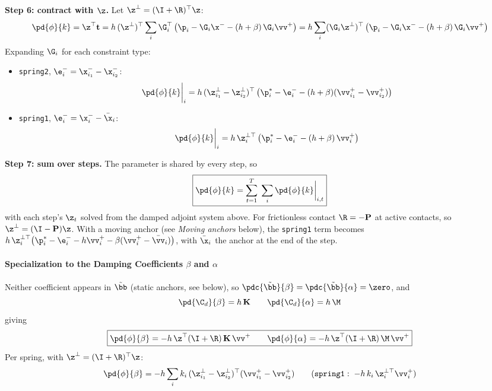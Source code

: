 \begin{derivation}
\textbf{Step 6: contract with $\z$.} Let $\z^\perp = (\I+\R)^\top\z$:
\begin{equation*}
    \pd{\phi}{k} = \z^\top\mathbf{t}
    = h\,(\z^\perp)^\top\sum_i\G_i^\top\left(\p_i - \G_i\x^- - (h+\beta)\,\G_i\vv^+\right)
    = h\sum_i(\G_i\z^\perp)^\top\left(\p_i - \G_i\x^- - (h+\beta)\,\G_i\vv^+\right)
\end{equation*}
Expanding $\G_i$ for each constraint type:
\begin{itemize}
    \item \texttt{spring2}, $\e_i^- = \x^-_{i_1} - \x^-_{i_2}$:
    \begin{equation}
        \pd{\phi}{k}\bigg|_i = h\,(\z^\perp_{i_1} - \z^\perp_{i_2})^\top\left(\p_i^* - \e_i^- - (h+\beta)(\vv^+_{i_1} - \vv^+_{i_2})\right)
    \end{equation}
    \item \texttt{spring1}, $\e_i^- = \x^-_i - \bar\x_i$:
    \begin{equation}
        \pd{\phi}{k}\bigg|_i = h\,\z^{\perp\top}_i\left(\p_i^* - \e_i^- - (h+\beta)\,\vv^+_i\right)
    \end{equation}
\end{itemize}
\textbf{Step 7: sum over steps.} The parameter is shared by every step, so
\begin{equation}
    \boxed{
    \pd{\phi}{k} = \sum_{t=1}^{T}\;\sum_i\pd{\phi}{k}\bigg|_{i,t}
    }
\end{equation}
with each step's $\z_t$ solved from the damped adjoint system above. For frictionless contact $\R = -\mathbf{P}$ at active contacts, so $\z^\perp = (\I - \mathbf{P})\z$.
\newline With a moving anchor (see \emph{Moving anchors} below), the \texttt{spring1} term becomes $h\,\z^{\perp\top}_i\big(\p_i^* - \e_i^- - h\vv_i^+ - \beta(\vv_i^+ - \bar\vv_i)\big)$, with $\bar\x_i$ the anchor at the end of the step.

\paragraph{Specialization to the Damping Coefficients $\beta$ and $\alpha$}
\mbox{}

\noindent Neither coefficient appears in $\tilde\bb$ (static anchors, see below), so $\pdc{\tilde\bb}{\beta} = \pdc{\tilde\bb}{\alpha} = \zero$, and
\begin{equation*}
    \pd{\C_d}{\beta} = h\,\mathbf{K}
    \qquad
    \pd{\C_d}{\alpha} = h\,\M
\end{equation*}
giving
\begin{equation}
    \boxed{
    \pd{\phi}{\beta} = -h\,\z^\top(\I+\R)\,\mathbf{K}\,\vv^+
    \qquad
    \pd{\phi}{\alpha} = -h\,\z^\top(\I+\R)\,\M\,\vv^+
    }
\end{equation}
Per spring, with $\z^\perp = (\I+\R)^\top\z$:
\begin{equation*}
    \pd{\phi}{\beta} = -h\sum_i k_i\,(\z^\perp_{i_1} - \z^\perp_{i_2})^\top(\vv^+_{i_1} - \vv^+_{i_2})
    \qquad (\text{\texttt{spring1}}: \;-h\,k_i\,\z^{\perp\top}_i\vv^+_i)
\end{equation*}


\end{derivation}
